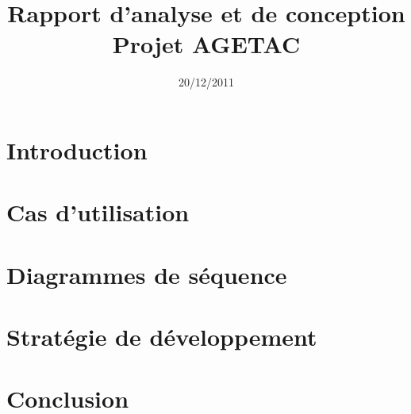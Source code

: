 \documentclass{article}
\title{Rapport d'analyse et de conception\\Projet AGETAC}
\date{20/12/2011}
\begin{document}
\maketitle

\tableofcontents 


\section*{Introduction}

\section{Cas d'utilisation}

\section{Diagrammes de séquence}

\section{Stratégie de développement}

\section*{Conclusion}
\end{document}
